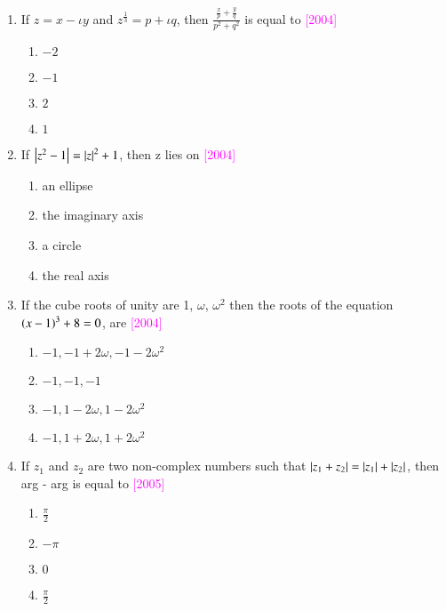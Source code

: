 \documentclass[journal,12pt,twocolumn]{IEEEtran}
\theoremstyle{remark}
\begin{document}
\begin{enumerate}
	\item{If $z=x-\iota y$ and $z^{\frac{1}{3}}=p+\iota q$, then $\frac{\frac{x}{p} + \frac{y}{q}}{p^2 + q^2}$ is equal to 
		\hfill{\textcolor{magenta}{[2004]}}
		\begin{multicols}{4}
		\begin{enumerate}
			\item{$-2$}
			\columnbreak
			\item{$-1$}
			\columnbreak
			\item{$2$}
			\columnbreak
			\item{$1$}
		\end{enumerate}
		\end{multicols}}

	\item{If $\left\vert z^2 - 1\right\vert = \left\vert z\right\vert^2 + 1$, then z lies on \hfill{\textcolor{magenta}{[2004]}}
		\begin{multicols}{2}
		\begin{enumerate}
			\item{an ellipse}
			\item{the imaginary axis}
			\columnbreak
			\item{a circle}
			\item{the real axis}
		\end{enumerate}
		\end{multicols}}
	

	\item{If the cube roots of unity are 1, $\omega$, $\omega^2$ then the roots of the equation $\left(x-1\right)^3 + 8 = 0$, are \hfill{\textcolor{magenta}{[2004]}}
		\begin{enumerate}
			\item{$-1,-1+2\omega,-1-2\omega ^2$}
			\item{$-1,-1,-1$}
			\item{$-1, 1-2\omega, 1-2\omega ^2$}
			\item{$-1, 1+2\omega, 1+2\omega ^2$}
		\end{enumerate}}

	\item{If $z_1$ and $z_2$ are two non-complex numbers such that $\left\vert z_1 + z_2\right\vert = \left\vert z_1\right\vert + \left\vert z_2\right\vert$, then arg - arg is equal to \hfill{\textcolor{magenta}{[2005]}}
		\begin{multicols}{4}
		\begin{enumerate}
			\item{$\frac{\pi}{2}$}
			\columnbreak
			\item{$-\pi$}
			\columnbreak
			\item{$0$}
			\columnbreak
			\item{$\frac{\pi}{2}$}
		\end{enumerate}
		\end{multicols}}


\end{enumerate}
\end{document}
